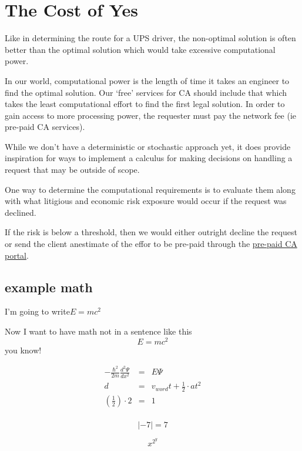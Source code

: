 \newpage
\section{The Cost of Yes}
Like in determining the route for a UPS driver, the non-optimal solution is
often better than the optimal solution which would take excessive
computational power.

In our world, computational power is the length of time it takes an engineer
to find the optimal solution. Our ‘free’ services for CA should include that
which takes the least computational effort to find the first legal solution.
In order to gain access to more processing power, the requester must pay the
network fee (ie pre-paid CA services).

While we don’t have a deterministic or stochastic approach yet, it does provide inspiration for ways to implement a calculus for making decisions on handling a request that may be outside of scope.

One way to determine the computational requirements is to evaluate them along with what litigious and economic risk exposure would occur if the request was declined.

If the risk is below a threshold, then we would either outright decline the
request or send the client anestimate of the effor to be pre-paid through the
\href{https://www.permitzip.com/ca-requests}{pre-paid CA portal}.

\subsection{example math}

I'm going to write$E=mc^2$

Now I want to have math not in a sentence like this $$E=mc^2$$ you know!

\begin{eqnarray}
    -\frac{\hbar^2}{2m}\frac{d^2\Psi}{dx^2}&=&E\Psi \\
    d&=&v_{word}t+\frac{1}{2}\cdot at^2 \label{eq:example_one} \\
    \left(\frac{1}{2}\right)\cdot 2 &=& 1 \\
\end{eqnarray}

$$\left|-7 \right| = 7$$

\begin{equation}
    x^{2^y}
\end{equation}


